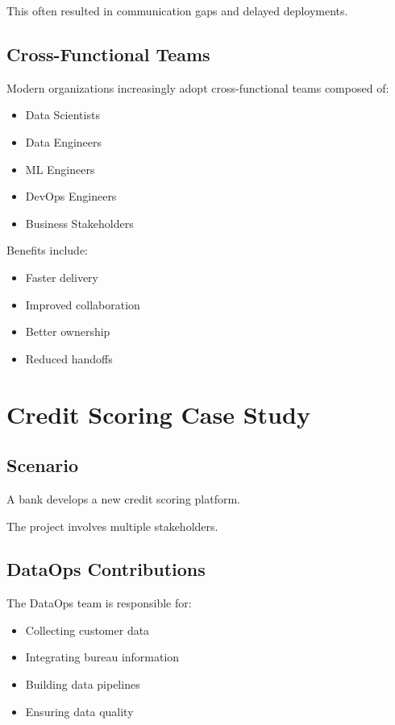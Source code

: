 This often resulted in communication gaps and delayed deployments.

\subsection{Cross-Functional Teams}

Modern organizations increasingly adopt cross-functional teams composed of:

\begin{itemize}
    \item Data Scientists
    \item Data Engineers
    \item ML Engineers
    \item DevOps Engineers
    \item Business Stakeholders
\end{itemize}

Benefits include:

\begin{itemize}
    \item Faster delivery
    \item Improved collaboration
    \item Better ownership
    \item Reduced handoffs
\end{itemize}

\section{Credit Scoring Case Study}

\subsection{Scenario}

A bank develops a new credit scoring platform.

The project involves multiple stakeholders.

\subsection{DataOps Contributions}

The DataOps team is responsible for:

\begin{itemize}
    \item Collecting customer data
    \item Integrating bureau information
    \item Building data pipelines
    \item Ensuring data quality
\end{itemize}

